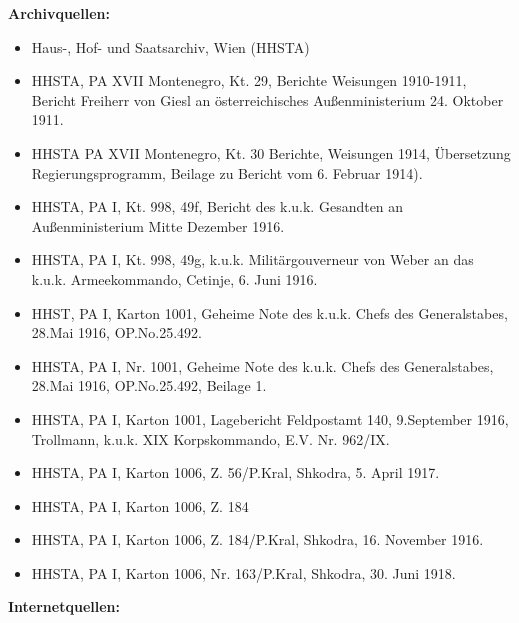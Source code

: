 \vspace{0,5cm}
\textbf{{\Large Archivquellen:}}
\begin{itemize}[label={},leftmargin=*,itemsep=0pt,parsep=10pt]
\item Haus-, Hof- und Saatsarchiv, Wien (HHSTA)
\item HHSTA, PA XVII Montenegro, Kt. 29, Berichte Weisungen 1910-1911, Bericht Freiherr von Giesl an österreichisches Außenministerium 24. Oktober 1911.
\item HHSTA PA XVII Montenegro, Kt. 30 Berichte, Weisungen 1914, Übersetzung Regierungsprogramm, Beilage zu Bericht vom 6. Februar 1914).
\item HHSTA, PA I, Kt. 998, 49f, Bericht des k.u.k. Gesandten an Außenministerium Mitte Dezember 1916.
\item HHSTA, PA I, Kt. 998, 49g, k.u.k. Militärgouverneur von Weber an das k.u.k. Armeekommando, Cetinje, 6. Juni 1916.
\item HHST, PA I, Karton 1001, Geheime Note des k.u.k. Chefs des Generalstabes, 28.Mai 1916, OP.No.25.492.
\item HHSTA, PA I, Nr. 1001, Geheime Note des k.u.k. Chefs des Generalstabes, 28.Mai 1916, OP.No.25.492, Beilage 1.
\item HHSTA, PA I, Karton 1001, Lagebericht Feldpostamt 140, 9.September 1916, Trollmann, k.u.k. XIX Korpskommando, E.V. Nr. 962/IX.
\item HHSTA, PA I, Karton 1006, Z. 56/P.Kral, Shkodra, 5. April 1917. 
\item HHSTA, PA I, Karton 1006, Z. 184
\item HHSTA, PA I, Karton 1006, Z. 184/P.Kral, Shkodra, 16. November 1916.
\item HHSTA, PA I, Karton 1006, Nr. 163/P.Kral, Shkodra, 30. Juni 1918.
\end{itemize}
\vspace{0,5cm}
\textbf{\Large{Internetquellen:}}

